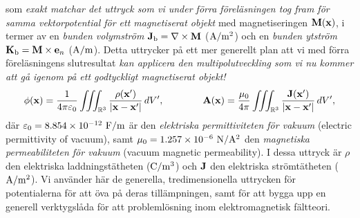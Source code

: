 {{{{{{  som {\it exakt matchar det uttryck som vi under f{\"o}rra
  f{\"o}rel{\"a}sningen tog fram f{\"o}r samma vektorpotential f{\"o}r
  ett magnetiserat objekt} med magnetiseringen ${\bf M}({\bf x})$, i
  termer av en {\it bunden volymstr{\"o}m}
  ${\bf J}_{\rm b}=\nabla\times{\bf M}$ (${\rm A}/{\rm m}^2$) och en
  {\it bunden ytstr{\"o}m} ${\bf K}_{\rm b}={\bf M}\times{\bf e}_n$
  (${\rm A}/{\rm m}$).
  Detta uttrycker p{\aa} ett mer generellt plan att vi med f{\"o}rra
  f{\"o}rel{\"a}sningens slutresultat {\it kan applicera den
  multipolutveckling som vi nu kommer att g{\aa} igenom p{\aa} ett
  godtyckligt magnetiserat objekt!}}
$$
  \phi({\bf x})={{1}\over{4\pi\varepsilon_0}}
    \iiint_{{\Bbb R}^3}{{\rho({\bf x}')}\over{|{\bf x}-{\bf x}'|}}\,dV',
    \qquad\qquad
  {\bf A}({\bf x})={{\mu_0}\over{4\pi}}
    \iiint_{{\Bbb R}^3}{{{\bf J}({\bf x}')}\over{|{\bf x}-{\bf x}'|}}\,dV',
$$
d{\"a}r $\varepsilon_0= 8.854\times10^{-12}\ {\rm F}/{\rm m}$ {\"a}r den
{\it elektriska permittiviteten f{\"o}r vakuum} (electric permittivity of
vacuum), samt $\mu_0=1.257\times10^{-6}\ {\rm N}/{\rm A}^2$ den {\it magnetiska
permeabiliteten f{\"o}r vakuum} (vacuum magnetic permeability). I dessa uttryck
{\"a}r $\rho$ den elektriska laddningst{\"a}theten
(${\rm C}/{\rm m}^3$) och ${\bf J}$ den elektriska str{\"o}mt{\"a}theten
(${\rm A}/{\rm m}^2$).
Vi anv{\"a}nder h{\"a}r de generella, tredimensionella uttrycken f{\"o}r
potentialerna f{\"o}r att {\"o}va p{\aa} deras till{\"a}mpningen, samt f{\"o}r
att bygga upp en generell verktygsl{\aa}da f{\"o}r att probleml{\"o}sning inom
elektromagnetisk f{\"a}ltteori.

}}}}}
